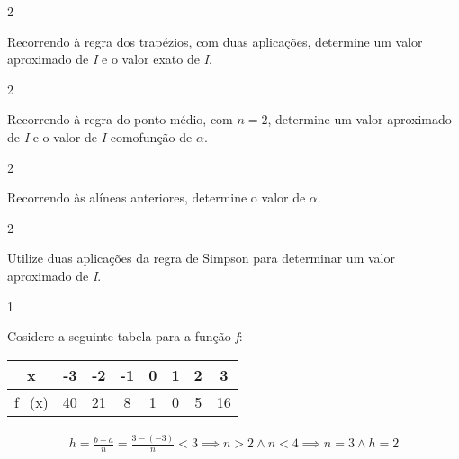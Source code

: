 \documentclass["CN_A-Exercises_Resolutions.tex"]{subfiles}
\begin{document}
\begin{questionBox}2{} %

  Recorrendo à regra dos trapézios, com duas aplicações, determine um valor aproximado de \textit{I} e o valor exato de \textit{I}.

\end{questionBox}

\begin{questionBox}2{} %

  Recorrendo à regra do ponto médio, com \(n = 2\), determine um valor aproximado de \textit{I} e o valor de \textit{I} comofunção de \(\alpha\).

\end{questionBox}

\begin{questionBox}2{} %
  
  Recorrendo às alíneas anteriores, determine o valor de \(\alpha\).

\end{questionBox}

\begin{questionBox}2{} %
  
  Utilize duas aplicações da regra de Simpson para determinar um valor aproximado de \textit{I}.

\end{questionBox}

\setcounter{question}{12}
\begin{questionBox}1{} %

  Cosidere a seguinte tabela para a função \textit{f}:
  \begin{center}
    \vspace{1ex}
    \begin{tabular}{C || *{7}{C}}

      x
      & -3 & -2 & -1 & 0 & 1 &  2 &  3

      \\\hline

      f_{(x)}
      & 40 & 21 & 8 & 1 & 0 & 5 & 16

    \end{tabular}
    \vspace{2ex}
  \end{center}

  \answer{}

  \begin{gather*}
    h 
    = \frac{b-a}{n}
    = \frac{3-(-3)}{n}
    < 3
    \implies
    n > 2 \land n<4 
    \implies
    n=3
    \land 
    h = 2
  \end{gather*}

\end{questionBox}
\end{document}
